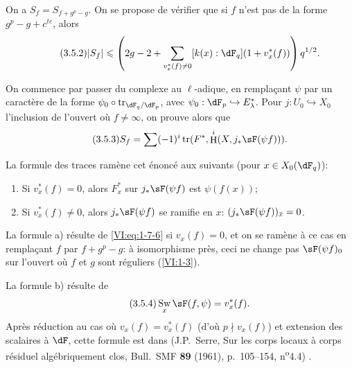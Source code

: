\documentclass[oneside]{book}
\DeclareMathOperator{\h}{H}
\DeclareMathOperator{\swan}{Sw}
\DeclareMathOperator{\tr}{tr}
\theoremstyle{sga-source}
\theoremstyle{sga-source-dash}
\theoremstyle{sga-source-dotdash}
\theoremstyle{sga-source-number-note-dash}
\theoremstyle{sga-source-note-number-dotdash}
\theoremstyle{sga-source-example-dotdash}
\theoremstyle{sga-source-inline-number}
\theoremstyle{sga-source-bare-number}
\theoremstyle{sga-source}
\begin{document}
On a $S_f=S_{f+g^p-g}$. On se propose de vérifier que si $f$ n'est pas de la 
forme $g^p-g+c^{t e}$, alors 
\begin{equation*}\tag{3.5.2}\label{VI:eq:3-5-2}
  |S_f|\leqslant \left(2 g-2+\sum_{v_x^\ast(f)\ne 0} [k(x):\dF_q] (1+v_x^\ast(f))\right) q^{1/2} \text{.}
\end{equation*}

On commence par passer du complexe au $\ell$-adique, en remplaçant $\psi$ par 
un caractère de la forme $\psi_0\circ \tr_{\dF_q/\dF_p}$, avec 
$\psi_0:\dF_p\hookrightarrow E_\lambda^\ast$. Pour $j:U_0\hookrightarrow X_0$ 
l'inclusion de l'ouvert où $f\ne\infty$, on prouve alors que 
\begin{equation*}\tag{3.5.3}\label{VI:eq:3-5-3}
  S_f = \sum (-1)^i \tr(F^\ast,\h^i(X,j_\ast \sF(\psi f))) \text{.} 
\end{equation*}

La formule des traces ramène cet énoncé aux suivants (pour 
$x\in X_0(\dF_q)$): 
\begin{enumerate}[\indent a)]
  \item Si $v_x^\ast(f)=0$, alors $F_x^\ast$ sur $j_\ast \sF(\psi f)$ est 
    $\psi(f(x))$; 
  \item Si $v_x^\ast(f)\ne 0$, alors $j_\ast \sF(\psi f)$ se ramifie en $x$: 
    $(j_\ast \sF(\psi f))_{\bar x}=0$. 
\end{enumerate}

La formule a) résulte de \eqref{VI:eq:1-7-6} si $v_x(f)=0$, et on se ramène 
à ce cas en remplaçant $f$ par $f+g^p-g$: à isomorphisme près, ceci ne 
change pas $\sF(\psi f)_0$ sur l'ouvert où $f$ et $g$ sont réguliers 
(\ref{VI:1-3}). 

La formule b) résulte de 
\begin{equation*}\tag{3.5.4}\label{VI:eq:3-5-4}
  \swan_x \sF(f,\psi) = v_x^\ast(f) \text{.} 
\end{equation*}
Après réduction au cas où $v_x(f)=v_x^\ast(f)$ (d'où $p\nmid v_x(f)$) 
et extension des scalaires à $\dF$, cette formule est dans 
(J.P.~Serre, Sur les corps locaux à corps résiduel algébriquement clos, Bull.~SMF \textbf{89} (1961), p.~105--154, n\textsuperscript{o}4.4) \cite[4.4]{se61}. 
\end{document}
